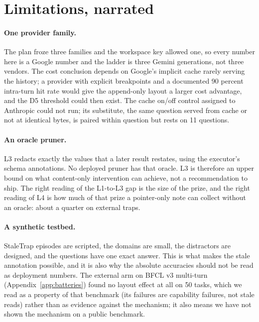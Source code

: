 \section{Limitations, narrated}
\label{sec:limits}

\paragraph{One provider family.} The plan froze three families and the workspace key allowed one, so every number here is a Google number and the ladder is three Gemini generations, not three vendors. The cost conclusion depends on Google's implicit cache rarely serving the history; a provider with explicit breakpoints and a documented 90 percent intra-turn hit rate \citep{a2608_00101} would give the append-only layout a larger cost advantage, and the D5 threshold could then exist. The cache on/off control assigned to Anthropic could not run; its substitute, the same question served from cache or not at identical bytes, is paired within question but rests on 11 questions.

\paragraph{An oracle pruner.} L3 redacts exactly the values that a later result restates, using the executor's schema annotations. No deployed pruner has that oracle. L3 is therefore an upper bound on what content-only intervention can achieve, not a recommendation to ship. The right reading of the L1-to-L3 gap is the size of the prize, and the right reading of L4 is how much of that prize a pointer-only note can collect without an oracle: about a quarter on external traps.

\paragraph{A synthetic testbed.} StaleTrap episodes are scripted, the domains are small, the distractors are designed, and the questions have one exact answer. This is what makes the stale annotation possible, and it is also why the absolute accuracies should not be read as deployment numbers. The external arm on BFCL v3 multi-turn (Appendix~\ref{app:batteries}) found no layout effect at all on 50 tasks, which we read as a property of that benchmark (its failures are capability failures, not stale reads) rather than as evidence against the mechanism; it also means we have not shown the mechanism on a public benchmark.

